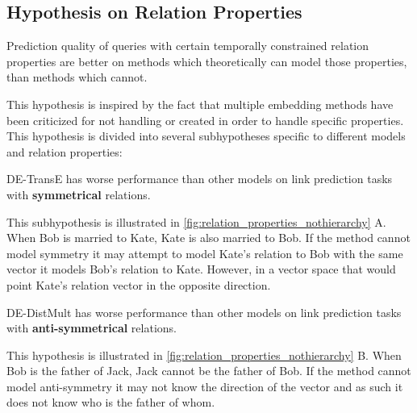 \subsection{Hypothesis on Relation Properties}
\label{sec:hypothesis_relation_properties}



\begin{hypothesis}
\label{hyp:relation_properties}
Prediction quality of queries with certain temporally constrained relation properties are better on methods which theoretically can model those properties, than methods which cannot.
\end{hypothesis}

This hypothesis is inspired by the fact that multiple embedding methods have been criticized for not handling or created in order to handle specific properties.
\missing[Examples]
This hypothesis is divided into several subhypotheses specific to different models and relation properties:

\begin{subhypothesis}
\label{hyp:relation_property_sym}
DE-TransE has worse performance than other models on link prediction tasks with \textbf{symmetrical} relations.
\end{subhypothesis}

This subhypothesis is illustrated in \autoref{fig:relation_properties_nothierarchy} A. When Bob is married to Kate, Kate is also married to Bob. If the method cannot model symmetry it may attempt to model Kate's relation to Bob with the same vector it models Bob's relation to Kate. However, in a vector space that would point Kate's relation vector in the opposite direction.

\begin{subhypothesis}
\label{hyp:relation_property_antisym}
DE-DistMult has worse performance than other models on link prediction tasks with \textbf{anti-symmetrical} relations.
\end{subhypothesis}

This hypothesis is illustrated in \autoref{fig:relation_properties_nothierarchy} B. When Bob is the father of Jack, Jack cannot be the father of Bob. If the method cannot model anti-symmetry it may not know the direction of the vector and as such it does not know who is the father of whom.


